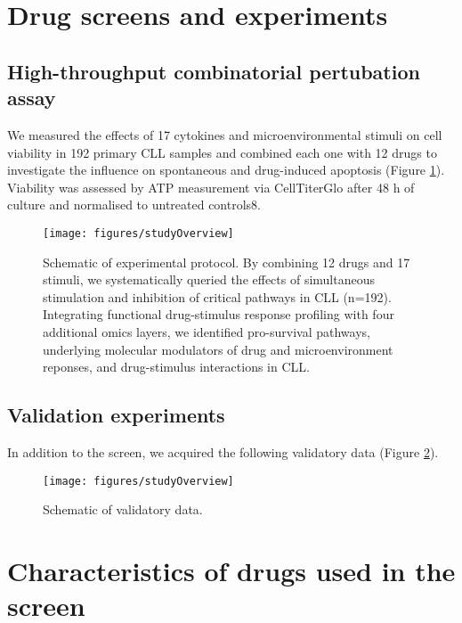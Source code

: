 \documentclass[11pt, a4paper, twosided]{book}
\begin{document}
\hypertarget{drug-screens-and-experiments}{%
\section{Drug screens and experiments}\label{drug-screens-and-experiments}}

\hypertarget{high-throughput-combinatorial-pertubation-assay}{%
\subsection{High-throughput combinatorial pertubation assay}\label{high-throughput-combinatorial-pertubation-assay}}

We measured the effects of 17 cytokines and microenvironmental stimuli on cell viability in 192 primary CLL samples and combined each one with 12 drugs to investigate the influence on spontaneous and drug-induced apoptosis (Figure \ref{fig:studyOverview}). Viability was assessed by ATP measurement via CellTiterGlo after 48 h of culture and normalised to untreated controls8.


\begin{figure}

{\centering \texttt{[image: figures/studyOverview]} 

}

\caption{Schematic of experimental protocol. By combining 12 drugs and 17 stimuli, we systematically queried the effects of simultaneous stimulation and inhibition of critical pathways in CLL (n=192). Integrating functional drug-stimulus response profiling with four additional omics layers, we identified pro-survival pathways, underlying molecular modulators of drug and microenvironment reponses, and drug-stimulus interactions in CLL.}\label{fig:studyOverview}
\end{figure}
\hypertarget{validation-experiments}{%
\subsection{Validation experiments}\label{validation-experiments}}

In addition to the screen, we acquired the following validatory data (Figure \ref{fig:additionalData}).


\begin{figure}

{\centering \texttt{[image: figures/studyOverview]} 

}

\caption{Schematic of validatory data.}\label{fig:additionalData}
\end{figure}
\hypertarget{characteristics-of-drugs-used-in-the-screen}{%
\section{Characteristics of drugs used in the screen}\label{characteristics-of-drugs-used-in-the-screen}}
\end{document}

